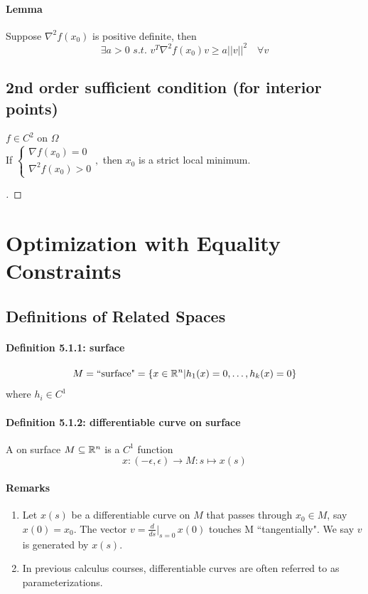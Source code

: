 \documentclass[11pt]{article}
\begin{document}
\paragraph{Lemma}
Suppose $\nabla^2 f(x_0)$ is positive definite, then
$$\exists a > 0 \,\, s.t. \,\, v^T\nabla^2f(x_0)v \geq a||v||^2 \quad \forall v$$


\subsection{2nd order sufficient condition (for interior points)}
$f \in C^2$ on $\Omega$ \\
If $\begin{cases}
	\nabla f(x_0) = 0 \\
	\nabla^2 f(x_0) > 0
\end{cases},$ then $x_0$ is a strict local minimum. \\
\begin{proof}
	[ ]
\end{proof}


\section{Optimization with Equality Constraints}

\subsection{Definitions of Related Spaces}
\paragraph{Definition 5.1.1: surface}
$$M =  \text{``surface"}  = \{ x \in \mathbb{R}^n | h_1(x) = 0, \hdots, h_k(x) = 0\}$$ 
where $h_i \in C^1$

\paragraph{Definition 5.1.2: differentiable curve on surface}
A  on surface $M \subseteq \mathbb{R}^n$ is a $C^1$ function
$$ x: (-\epsilon, \epsilon) \rightarrow M: s \mapsto x(s)$$ 
\paragraph{Remarks}
\begin{enumerate}
	\item Let $x(s)$ be a differentiable curve on $M$ that passes through $x_0 \in M$, say $x(0) = x_0$. The vector $v = \frac{d}{ds}|_{s=0} \, x(0)$ touches M ``tangentially". We say $v$ is generated by $x(s)$.
	\item In previous calculus courses, differentiable curves are often referred to as parameterizations.
\end{enumerate}
\end{document}

